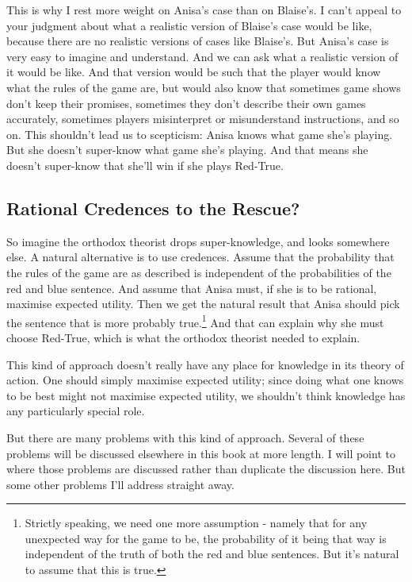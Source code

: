 \documentclass[
  11pt,
]{book}
\begin{document}
This is why I rest more weight on Anisa's case than on Blaise's. I can't appeal to your judgment about what a realistic version of Blaise's case would be like, because there are no realistic versions of cases like Blaise's. But Anisa's case is very easy to imagine and understand. And we can ask what a realistic version of it would be like. And that version would be such that the player would know what the rules of the game are, but would also know that sometimes game shows don't keep their promises, sometimes they don't describe their own games accurately, sometimes players misinterpret or misunderstand instructions, and so on. This shouldn't lead us to scepticism: Anisa knows what game she's playing. But she doesn't super-know what game she's playing. And that means she doesn't super-know that she'll win if she plays Red-True.

\hypertarget{probrescue}{%
\subsection{Rational Credences to the Rescue?}\label{probrescue}}

So imagine the orthodox theorist drops super-knowledge, and looks somewhere else. A natural alternative is to use credences. Assume that the probability that the rules of the game are as described is independent of the probabilities of the red and blue sentence. And assume that Anisa must, if she is to be rational, maximise expected utility. Then we get the natural result that Anisa should pick the sentence that is more probably true.\footnote{Strictly speaking, we need one more assumption - namely that for any unexpected way for the game to be, the probability of it being that way is independent of the truth of both the red and blue sentences. But it's natural to assume that this is true.} And that can explain why she must choose Red-True, which is what the orthodox theorist needed to explain.

This kind of approach doesn't really have any place for knowledge in its theory of action. One should simply maximise expected utility; since doing what one knows to be best might not maximise expected utility, we shouldn't think knowledge has any particularly special role.

But there are many problems with this kind of approach. Several of these problems will be discussed elsewhere in this book at more length. I will point to where those problems are discussed rather than duplicate the discussion here. But some other problems I'll address straight away.
\end{document}
